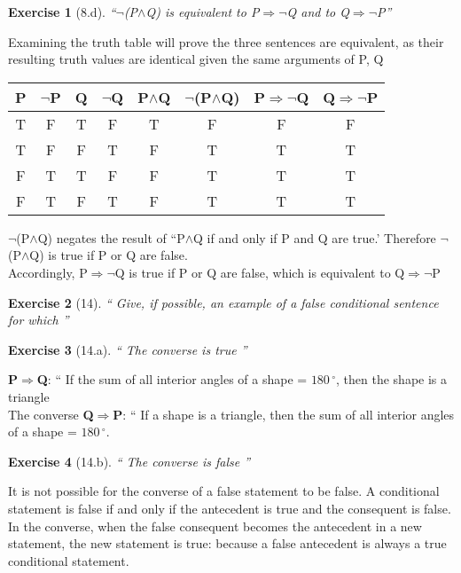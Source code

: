 \documentclass[11pt]{article}
\theoremstyle{quest}
\newtheorem*{exercise}{Exercise}
\begin{document}
\begin{exercise}[8.d]
  ``$\neg$(P$\wedge$Q) is equivalent to P$\Rightarrow$$\neg$Q and to Q$\Rightarrow$$\neg$P''
\end{exercise}

Examining the truth table will prove the three sentences are equivalent, as their 
resulting truth values are identical given the same arguments of P, Q

\begin{table}[ht] 
\centering %
\begin{tabular}{c c c c c c c c} %
\hline\hline %
P & $\neg$P & Q & $\neg$Q & P$\wedge$Q & $\neg$(P$\wedge$Q) & P$\Rightarrow$$\neg$Q & Q$\Rightarrow$$\neg$P\\ [0.5ex] %
\hline %
T & F & T & F & T & F & F & F \\ %
T & F & F & T & F & T & T & T \\
F & T & T & F & F & T & T & T \\
F & T & F & T & F & T & T & T \\ [1ex] %
\hline %
\end{tabular} 
\end{table}

$\neg$(P$\wedge$Q) negates the result of ``P$\wedge$Q if and only if P and Q are true.' 
Therefore $\neg$(P$\wedge$Q) is true if P or Q are false.\\
Accordingly, P$\Rightarrow$$\neg$Q is true if P or Q are false, which is equivalent to Q$\Rightarrow$$\neg$P

\newpage

\begin{exercise}[14]
  `` Give, if possible, an example of a false conditional sentence for which ''
\end{exercise}
\begin{exercise}[14.a]
  `` The converse is true ''
\end{exercise}

\noindent \textbf{P$\Rightarrow$Q}: `` If the sum of all interior angles of a shape = $180\,^{\circ}$, then the shape is a triangle \\
\noindent The converse \textbf{Q$\Rightarrow$P}: `` If a shape is a triangle, then the sum of all interior angles of a shape = $180\,^{\circ}$.
\begin{exercise}[14.b]
  `` The converse is false ''
\end{exercise}
\noindent It is not possible for the converse of a false statement to be false. A conditional statement is false if and only if the antecedent is true and the consequent is false. In the converse, when the false consequent becomes the antecedent in a new statement, the new statement is true: because a false antecedent is always a true conditional statement.
\end{document}
